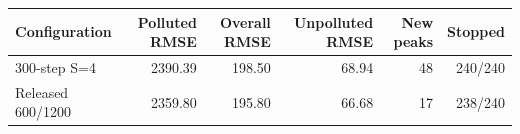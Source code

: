 \begingroup
{}
\begin{tabular}{lrrrrr}
\toprule
Configuration & Polluted RMSE & Overall RMSE & Unpolluted RMSE & New peaks & Stopped \\
\midrule
300-step S=4 & 2390.39 & 198.50 & 68.94 & 48 & 240/240 \\
Released 600/1200 & 2359.80 & 195.80 & 66.68 & 17 & 238/240 \\
\bottomrule
\end{tabular}
\endgroup
